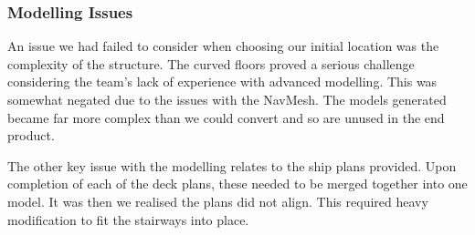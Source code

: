 \subsubsection{Modelling Issues}

An issue we had failed to consider when choosing our initial location
was the complexity of the structure. The curved floors proved a serious
challenge considering the team's lack of experience with advanced modelling.
This was somewhat negated due to the issues with the NavMesh. The
models generated became far more complex than we could convert and
so are unused in the end product.

The other key issue with the modelling relates to the ship plans provided.
Upon completion of each of the deck plans, these needed to be merged
together into one model. It was then we realised the plans did not
align. This required heavy modification to fit the stairways into
place.

